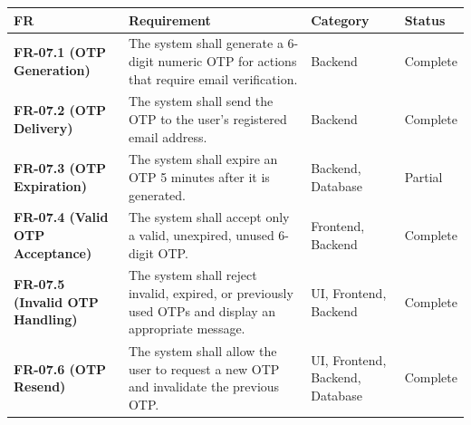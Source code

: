 \documentclass[12pt]{article}
\renewcommand{\baselinestretch}{1.5}
\begin{document}
\begingroup
\small
\renewcommand{\baselinestretch}{1.0}\selectfont
\renewcommand{\arraystretch}{1.15}
\setlength{\tabcolsep}{6pt}
\begin{longtable}{|>{\raggedright\arraybackslash}p{}|>{\raggedright\arraybackslash}p{}|>{\raggedright\arraybackslash}p{}|>{\raggedright\arraybackslash}p{}|}
\hline
\textbf{FR} & \textbf{Requirement} & \textbf{Category} & \textbf{Status} \\ \hline
\endhead
\textbf{FR-07.1 (OTP Generation)} & The system shall generate a 6-digit numeric OTP for actions that require email verification. & Backend & Complete \\ \hline
\textbf{FR-07.2 (OTP Delivery)} & The system shall send the OTP to the user's registered email address. & Backend & Complete \\ \hline
\textbf{FR-07.3 (OTP Expiration)} & The system shall expire an OTP 5 minutes after it is generated. & Backend, Database & Partial \\ \hline
\textbf{FR-07.4 (Valid OTP Acceptance)} & The system shall accept only a valid, unexpired, unused 6-digit OTP. & Frontend, Backend & Complete \\ \hline
\textbf{FR-07.5 (Invalid OTP Handling)} & The system shall reject invalid, expired, or previously used OTPs and display an appropriate message. & UI, Frontend, Backend & Complete \\ \hline
\textbf{FR-07.6 (OTP Resend)} & The system shall allow the user to request a new OTP and invalidate the previous OTP. & UI, Frontend, Backend, Database & Complete \\ \hline
\end{longtable}
\endgroup
\par\medskip

\par\medskip
\hypertarget{sec:ui-prototype-specimens}{}
\end{document}
